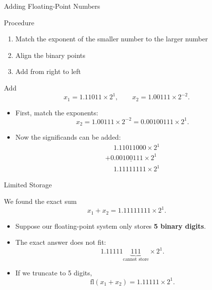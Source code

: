 \documentclass[10pt]{beamer}
\begin{document}
\begin{frame}{Adding Floating-Point Numbers}

\begin{block}{Procedure}
    \begin{enumerate}
        \item Match the exponent of the smaller number to the larger number
        \item Align the binary points
        \item Add from right to left
    \end{enumerate}
\end{block}

\begin{example}
Add
\[
x_1 = 1.11011\times 2^{1},
\qquad
x_2 = 1.00111\times 2^{-2}.
\]
\end{example}

\begin{itemize}
    \item First, match the exponents:
    \[
    x_2
    =1.00111\times2^{-2}
    =0.00100111\times2^1.
    \]

    \item Now the significands can be added:
    \[
    \begin{array}{r}
      \phantom{+}1.11011000 \times 2^{1} \\
      \underline{+0.00100111 \times 2^{1}} \\
      \phantom{+}1.11111111 \times 2^{1}
    \end{array}
    \]
\end{itemize}

\end{frame}

\begin{frame}{Limited Storage}

We found the exact sum
\[
x_1+x_2 = 1.11111111\times2^1.
\]

\vfill

\begin{itemize}
    \item Suppose our floating-point system only stores
          \textbf{5 binary digits}.

    \item The exact answer does not fit:
    \[
    1.11111\underbrace{111}_{\text{cannot store}}\times2^1.
    \]

    \item If we truncate to 5 digits,
    \[
    \mathrm{fl}(x_1+x_2)
    =
    1.11111\times2^1.
    \]
\end{itemize}

\vfill


\end{frame}
\end{document}
